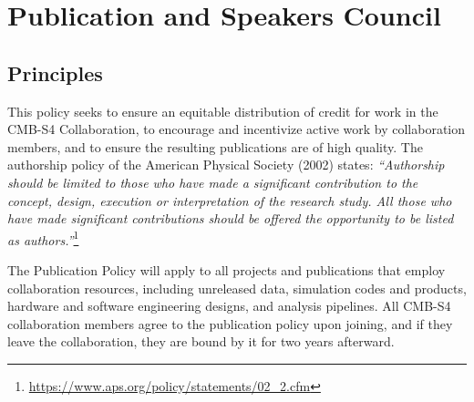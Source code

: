 \section{Publication and Speakers Council}
\label{sec:pub}





\subsection{Principles}
This policy seeks to ensure an equitable distribution of credit for work in the CMB-S4 Collaboration, to encourage and incentivize active work by collaboration members, and to ensure the resulting publications are of high quality. The authorship policy of the American Physical Society (2002) states: \textit{``Authorship should be limited to those who have made a significant contribution to the concept, design, execution or interpretation of the research study. All those who have made significant contributions should be offered the opportunity to be listed as authors.''}\footnote{\url{https://www.aps.org/policy/statements/02_2.cfm}}

The Publication Policy will apply to all projects and publications that employ collaboration resources, including unreleased data, simulation codes and products, hardware and software
engineering designs, and analysis pipelines. All CMB-S4 collaboration members agree to the publication policy upon joining, and if they leave the collaboration, they are bound by it for two years afterward.

